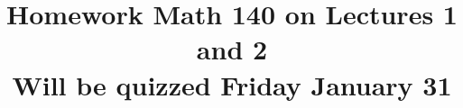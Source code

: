 \documentclass{article}
\date{}
\newcommand{\homeworkEnd}{\end{document}}
\newcommand{\homeworkStart}[1]{\title{#1}
\begin{document}
\maketitle}

\homeworkStart{Homework Math 140 on Lectures 1 and 2 \\Will be quizzed Friday January 31}




%
\homeworkEnd
\begin{comment}
\homeworkStart{Homework Math 140 on Lectures 3 \\Will be quizzed Friday September 13}



\homeworkEnd
\homeworkStart{Homework Math 140, Lectures 4 and 5}

\homeworkEnd
\end{comment}
\begin{comment}
\homeworkStart{Homework Math 140, Lectures 6 and 7. \\ Will be quizzed Wednesday September 25}



\homeworkEnd
\end{comment}
\begin{comment}



\end{comment}
\begin{comment}
\homeworkStart{Homework Math 140, Lecture 8. \\ Will be quizzed Friday October 4}


\homeworkEnd
\end{comment}
\begin{comment}
\homeworkStart{Homework Math 140, Lectures 8,9. \\ Will be quizzed Wednesday October 9}


\homeworkEnd
\end{comment}
\end{document}
